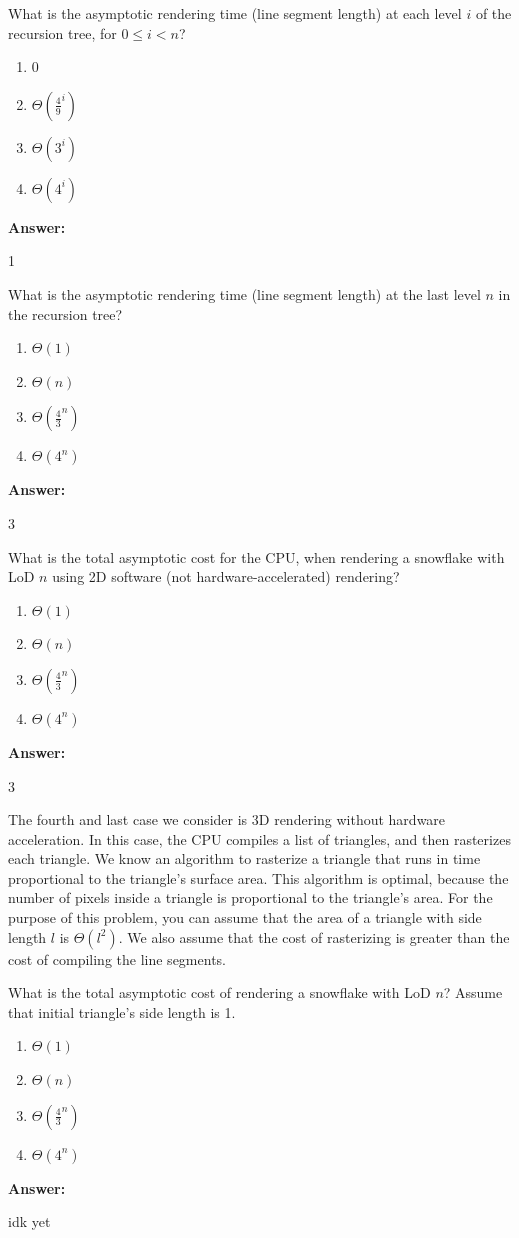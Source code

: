 \documentclass[12pt,twoside]{article}
\newcommand{\answer}{
	\par\medskip
	\textbf{Answer:}
}
\newcommand{\answerIq}{ \answer
	1
}
\newcommand{\answerIr}{ \answer
	3
}
\newcommand{\answerIs}{ \answer
	3
}
\newcommand{\answerIt}{ \answer
	idk yet
}
\begin{document}
\begin{problems}
\begin{problemparts}
		\problempart {} What is the asymptotic rendering time (line segment length)
		at each level $i$ of the recursion tree, for $0 \le i < n$?
		\begin{enumerate}
			\item 0
			\item $\Theta(\frac{4}{9} ^ i)$
			\item $\Theta(3 ^ i)$
			\item $\Theta(4 ^ i)$
		\end{enumerate}
		\answerIq

		\problempart {} What is the asymptotic rendering time (line segment length)
		at the last level $n$ in the recursion tree?
		\begin{enumerate}
			\item $\Theta(1)$
			\item $\Theta(n)$
			\item $\Theta(\frac{4}{3}^n)$
			\item $\Theta(4^n)$
		\end{enumerate}
		\answerIr

		\problempart {} What is the total asymptotic cost for the CPU, when rendering
		a snowflake with LoD $n$ using 2D software (not hardware-accelerated)
		rendering?
		\begin{enumerate}
			\item $\Theta(1)$
			\item $\Theta(n)$
			\item $\Theta(\frac{4}{3}^n)$
			\item $\Theta(4^n)$
		\end{enumerate}
		\answerIs

	\end{problemparts}

	The fourth and last case we consider is 3D rendering without hardware
	acceleration. In this case, the CPU compiles a list of triangles, and then
	rasterizes each triangle. We know an algorithm to rasterize a triangle that
	runs in time proportional to the triangle's surface area. This algorithm is
	optimal, because the number of pixels inside a triangle is proportional to the
	triangle's area. For the purpose of this problem, you can assume that the area
	of a triangle with side length $l$ is $\Theta(l^2)$. We also assume that the
	cost of rasterizing is greater than the cost of compiling the line segments.

	\begin{problemparts}
		\problempart {} What is the total asymptotic cost of rendering a snowflake
		with LoD $n$? Assume that initial triangle's side length is 1.
		\begin{enumerate}
			\item $\Theta(1)$
			\item $\Theta(n)$
			\item $\Theta(\frac{4}{3}^n)$
			\item $\Theta(4^n)$
		\end{enumerate}
		\answerIt


\end{problemparts}
\end{problems}
\end{document}
